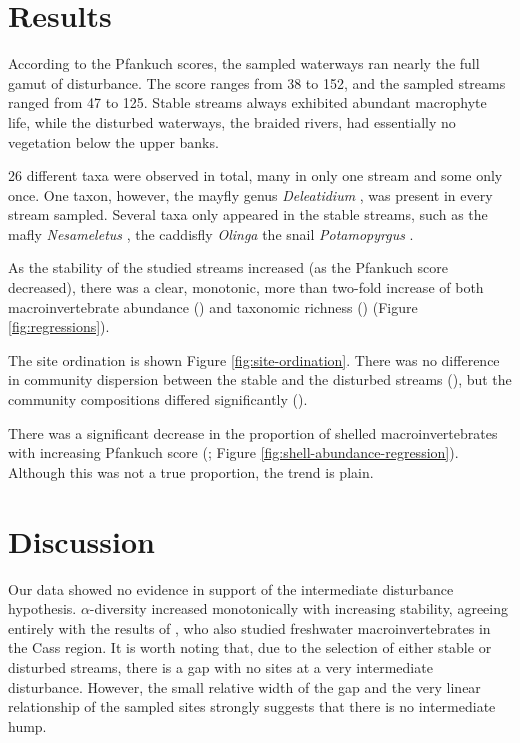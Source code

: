 \documentclass[a4paper,10pt]{article}
\newcommand\inputresults[1]{\unskip}
\newcommand\spbinom[1]{%
	\emph{#1}%
}
\begin{document}

\section*{Results}

According to the Pfankuch scores, the sampled waterways ran nearly the full gamut of disturbance.
The score ranges from 38 to 152, and the sampled streams ranged from 47 to 125.
Stable streams always exhibited abundant macrophyte life, while the disturbed waterways, the braided rivers, had essentially no vegetation below the upper banks.

26 different taxa were observed in total, many in only one stream and some only once.
One taxon, however, the mayfly genus \spbinom{Deleatidium}, was present in every stream sampled.
Several taxa only appeared in the stable streams, such as the mafly \spbinom{Nesameletus}, the caddisfly \spbinom{Olinga} the snail \spbinom{Potamopyrgus}.


As the stability of the studied streams increased (as the Pfankuch score decreased), there was a clear, monotonic, more than two-fold increase of both macroinvertebrate abundance (\inputresults{abundance-regression}) and taxonomic richness (\inputresults{richness-regression}) (Figure \ref{fig:regressions}).

The site ordination is shown Figure \ref{fig:site-ordination}.
There was no difference in community dispersion between the stable and the disturbed streams (\inputresults{permdisp}), but the community compositions differed significantly (\inputresults{permanova}).

There was a significant decrease in the proportion of shelled macroinvertebrates with increasing Pfankuch score (\inputresults{shell-abundance-regression}; Figure \ref{fig:shell-abundance-regression}).
Although this was not a true proportion, the trend is plain.

\section*{Discussion}

Our data showed no evidence in support of the intermediate disturbance hypothesis.
$\alpha$-diversity increased monotonically with increasing stability, agreeing entirely with the results of \textcite{diversity-stability-canterbury}, who also studied freshwater macroinvertebrates in the Cass region.
It is worth noting that, due to the selection of either stable or disturbed streams, there is a gap with no sites at a very intermediate disturbance.
However, the small relative width of the gap and the very linear relationship of the sampled sites strongly suggests that there is no intermediate hump.
\end{document}
